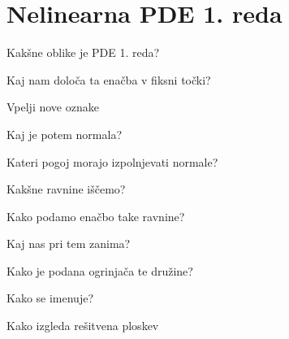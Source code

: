 \documentclass{article}
\begin{document}
    \section{Nelinearna PDE 1. reda}
    \begin{enumerate}
        \item Kakšne oblike je PDE 1. reda?
        {\color{red}\item Kaj nam določa ta enačba v fiksni točki?}
        \item Vpelji nove oznake
        \item Kaj je potem normala?
        {\color{red}\item Kateri pogoj morajo izpolnjevati normale?}
        {\color{red}\item Kakšne ravnine iščemo?}
        {\color{red}\item Kako podamo enačbo take ravnine?}
        {\color{red}\item Kaj nas pri tem zanima?}
        {\color{red}\item Kako je podana ogrinjača te družine?}
        \item Kako se imenuje?
        {\color{red}\item Kako izgleda rešitvena ploskev}
    \end{enumerate}
\end{document}

